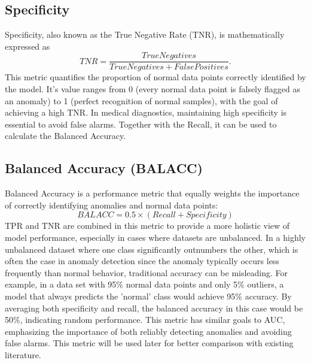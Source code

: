 \subsection{Specificity}
Specificity, also known as the True Negative Rate (TNR), is mathematically expressed as \[ TNR=\frac{TrueNegatives}{TrueNegatives+FalsePositives} .\] This metric quantifies the proportion of normal data points correctly identified by the model. It's value ranges from 0 (every normal data point is falsely flagged as an anomaly) to 1 (perfect recognition of normal samples), with the goal of achieving a high TNR. In medical diagnostics, maintaining high specificity is essential to avoid false alarms. Together with the Recall, it can be used to calculate the Balanced Accuracy.

\subsection{Balanced Accuracy (BALACC)}
Balanced Accuracy is a performance metric that equally weights the importance of correctly identifying anomalies and normal data points: \[ BALACC=0.5 \times (Recall + Specificity) \] TPR and TNR are combined in this metric to provide a more holistic view of model performance, especially in cases where datasets are unbalanced. In a highly unbalanced dataset where one class significantly outnumbers the other, which is often the case in anomaly detection since the anomaly typically occurs less frequently than normal behavior, traditional accuracy can be misleading. For example, in a data set with 95\% normal data points and only 5\% outliers, a model that always predicts the 'normal' class would achieve 95\% accuracy. By averaging both specificity and recall, the balanced accuracy in this case would be 50\%, indicating random performance. This metric has similar goals to AUC, emphasizing the importance of both reliably detecting anomalies and avoiding false alarms. This metric will be used later for better comparison with existing literature.

